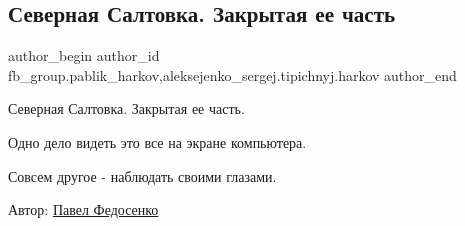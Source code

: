  
 
 
 
 
 
\subsection{Северная Салтовка. Закрытая ее часть}
\label{sec:15_05_2022.fb.fb_group.pablik_harkov.1.saltovka}
 
\ifcmt
 author_begin
   author_id fb_group.pablik_harkov,aleksejenko_sergej.tipichnyj.harkov
 author_end
\fi

Северная Салтовка. Закрытая ее часть. 

Одно дело видеть это все на экране компьютера.


Совсем другое - наблюдать своими глазами.

Автор: \href{https://www.facebook.com/pavelveter}{Павел Федосенко}

